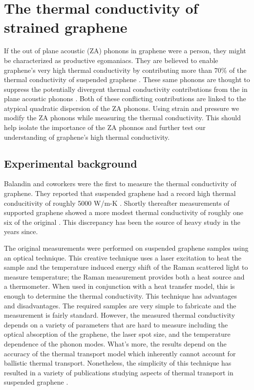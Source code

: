\chapter{The thermal conductivity of strained graphene\label{chap:therm}}
If the out of plane acoustic (ZA) phonons in graphene were a person, they might be characterized as productive egomaniacs.
They are believed to enable graphene's very high thermal conductivity by contributing more than 70\% of the thermal conductivity of suspended graphene \cite{Lindsay2010}.
These same phonons are thought to suppress the potentially divergent thermal conductivity contributions from the in plane acoustic phonons \cite{Pereira2013,Bonini2012}.
Both of these conflicting contributions are linked to the atypical quadratic dispersion of the ZA phonons.
Using strain and pressure we modify the ZA phonons while measuring the thermal conductivity.
This should help isolate the importance of the ZA phonnos and further test our understanding of graphene's high thermal conductivity.

\section{Experimental background \label{sec:therm:Exp}}
Balandin and coworkers were the first to measure the thermal conductivity of gra\-phene.
They reported that suspended graphene had a record high thermal conducitivity of roughly 5000 W/m-K \cite{Balandin2008}.
Shortly thereafter measurements of supported graphene showed a more modest thermal conductivity of roughly one six of the original \cite{Seol2010}.
This discrepancy has been the source of heavy study in the years since.

The original measurements were performed on suspended graphene samples using an optical technique.
This creative technique uses a laser excitation to heat the sample and the temperature induced energy shift of the Raman scattered light to measure temperature; the Raman measurement provides both a heat source and a thermometer.
When used in conjunction with a heat transfer model, this is enough to determine the thermal conductivity.
This technique has advantages and disadvantages.
The required samples are very simple to fabricate and the measurement is fairly standard.
However, the measured thermal conductivity depends on a variety of parameters that are hard to measure including the optical absorption of the graphene, the laser spot size, and the temperature dependence of the phonon modes.
What's more, the results depend on the accuracy of the thermal transport model which inherently cannot account for ballistic thermal transport.
Nonetheless, the simplicity of this technique has resulted in a variety of publications studying aspects of thermal transport in suspended graphene \cite{Balandin2008,Faugeras2010,Cai2010,Ghosh2010,Lee2011,Chen2011a,Chen2012}.


